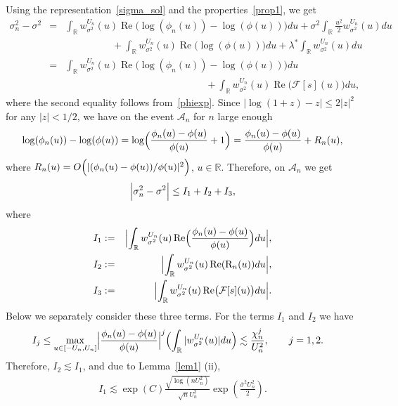 \documentclass[a4paper,11pt]{article}
\theoremstyle{definition}
\newcommand{\R}{{\mathbb{R}}}
\newcommand{\1}{\mathbb{I}}
\newcommand{\A}{\mathscr{A}}
\renewcommand{\A}{\mathcal{A}}
\def\R{\mathbb{R}}
\renewcommand{\Re}{\operatorname{Re}}
\newcommand{\F}{\mathcal{F}}
\theoremstyle{remark}
\begin{document}
Using the representation~\eqref{sigma_sol} and the properties~\eqref{prop1}, we get 
\begin{eqnarray*}
    \sigma^2_n - \sigma^2 &=& \int_{\R}w^{U_n}_{\sigma^2}(u)\Re\bigl(\log(\phi_n(u)) - \log(\phi(u))\bigr)du + \sigma^2\int_{\R}\frac{u^2}{2} w^{U_n}_{\sigma^2}(u) du \\
    &&\hspace{2cm} + \int_{\R}w^{U_n}_{\sigma^2}(u)\Re\bigl(\log(\phi(u))\bigr)du + \lambda^* \int_{\R}w^{U_n}_{\sigma^2}(u)du \\
    &=& \int_{\R} w^{U_n}_{\sigma^2}(u)\Re\bigl(\log(\phi_n(u)) - \log(\phi(u))\bigr)du \\
&&    \hspace{6cm}+ \int_{\R}w^{U_n}_{\sigma^2}(u)
\Re\bigl(\F [s](u)\bigr)du,
\end{eqnarray*}
where the second equality follows from~\eqref{phiexp}.
Since \(|\log(1+z) -z| \leq 2 |z|^2\) for any \(|z| <1/2\), we have on the event \(\A_n\) for $n$ large enough  \begin{eqnarray*}
    \log(\phi_n(u)) - \log(\phi(u)) =
    \log\Bigl(\frac{\phi_n(u) - \phi(u)}{\phi(u)} +1\Bigr) 
    \label{log_eq} =  \frac{\phi_n(u) - \phi(u)}{\phi(u)} + R_n (u),
\end{eqnarray*}
where \( R_n (u) =  O\Bigl(|(\phi_n(u) - \phi(u))/\phi(u)|^2\Bigr)\), \(u \in \R\). Therefore, on $\A_n$ we get 
\begin{eqnarray*}
    \Bigl|\sigma^2_n - \sigma^2
\Bigr|
\leq   I_1 + I_2 + I_3,
\end{eqnarray*}
where 
\begin{eqnarray*}
I_1 &:=& \Bigl|\int_{\R} w^{U_n}_{\sigma^2}(u)\Re\Bigl(\frac{\phi_n(u) - \phi(u)}{\phi(u)}\Bigr)du\Bigr|,\\
I_2 &:=& \Bigl|\int_{\R} w^{U_n}_{\sigma^2}(u) \Re(\mathrm{R}_n (u)) du \Bigr|,\\
I_3 &:=& \Bigl| \int_{\R}w^{U_n}_{\sigma^2}(u)\Re\bigl(\F [s ](u)\bigr)du\Bigr|.
\end{eqnarray*}Below we separately consider these three terms. 
For the terms \(I_1\) and \(I_2\) we have 
\begin{align*}
    I_j &\leq \max_{u \in [-U_n,U_n]}\Bigl| \frac{\phi_n(u) - \phi(u)}{\phi(u)}\Bigr|^{j} \Bigl(\int_{\R} |w^{U_n}_{\sigma^2}(u)| du \Bigr) 
     \lesssim \frac{\chi_n^{j}}{U_n^{2}}, \qquad j=1,2.
\end{align*}
Therefore,  \(I_2 \lesssim I_1\), and 
due to Lemma~\ref{lem1} (ii), 
\begin{eqnarray*}
I_1  \lesssim  \exp(C)
\frac{\sqrt{\log(nU_n^2)}}{\sqrt{n}U_n^{2}}
\exp(\frac{\overline{\sigma}^2U_n^2}{2}).
\end{eqnarray*}
\end{document}

